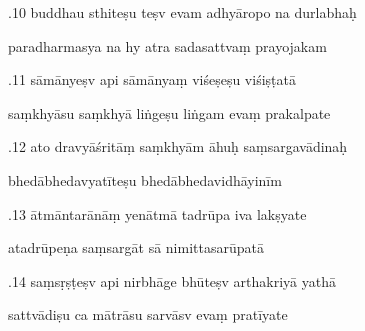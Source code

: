 \documentclass[article,12pt,a4paper]{memoir}%
\newcounter{parCount}
\begin{document}
	  
	  \pstart {}.10 buddhau sthiteṣu teṣv evam adhyāropo na durlabhaḥ 
	{}
	\pend%
      

	  
	  \pstart \leavevmode%
	paradharmasya na hy atra sadasattvaṃ prayojakam 
	{}
	\pend%
      

	  
	  \pstart {}.11 sāmānyeṣv api sāmānyaṃ viśeṣeṣu viśiṣṭatā 
	{}
	\pend%
      

	  
	  \pstart \leavevmode%
	saṃkhyāsu saṃkhyā liṅgeṣu liṅgam evaṃ prakalpate 
	{}
	\pend%
      

	  
	  \pstart {}.12 ato dravyāśritāṃ saṃkhyām āhuḥ saṃsargavādinaḥ 
	{}
	\pend%
      

	  
	  \pstart \leavevmode%
	bhedābhedavyatīteṣu bhedābhedavidhāyinīm 
	{}
	\pend%
      

	  
	  \pstart {}.13 ātmāntarānāṃ yenātmā tadrūpa iva lakṣyate 
	{}
	\pend%
      

	  
	  \pstart \leavevmode%
	atadrūpeṇa saṃsargāt sā nimittasarūpatā 
	{}
	\pend%
      

	  
	  \pstart {}.14 saṃsṛṣṭeṣv api nirbhāge bhūteṣv arthakriyā yathā 
	{}
	\pend%
      

	  
	  \pstart \leavevmode%
	sattvādiṣu ca mātrāsu sarvāsv evaṃ pratīyate 
	{}
	\pend%
      
\end{document}
